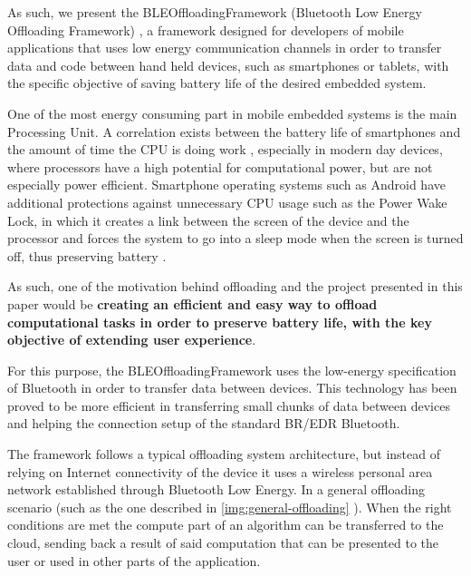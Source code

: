 As such, we present the BLEOffloadingFramework (Bluetooth Low Energy Offloading Framework) , a framework designed for developers of mobile applications that uses low energy communication channels in order to transfer data and code between hand held devices, such as smartphones or tablets, with the specific objective of saving battery life of the desired embedded system.

One of the most energy consuming part in mobile embedded systems is the main Processing Unit. A correlation exists between the battery life of smartphones and the amount of time the CPU is doing work \cite{ferreira2011understanding}, especially in modern day devices, where processors have a high potential for computational power, but are not especially power efficient. Smartphone operating systems such as Android have additional protections against unnecessary CPU usage such as the Power Wake Lock, in which it creates a link between the screen of the device and the processor and forces the system to go into a sleep mode when the screen is turned off, thus preserving battery \cite{datta2012android}.

As such, one of the motivation behind offloading and the project presented in this paper would be \textbf{creating an efficient and easy way to offload computational tasks in order to preserve battery life, with the key objective of extending user experience}.

For this purpose, the BLEOffloadingFramework uses the low-energy specification of Bluetooth in order to transfer data between devices. This technology has been proved to be more efficient in transferring small chunks of data between devices \cite{mackensen2012performance} and helping the connection setup of the standard BR/EDR Bluetooth.

The framework follows a typical offloading system architecture, but instead of relying on Internet connectivity of the device it uses a wireless personal area network established through Bluetooth Low Energy. In a general offloading scenario (such as the one described in \ref{img:general-offloading} ). When the right conditions are met the compute part of an algorithm can be transferred to the cloud, sending back a result of said computation that can be presented to the user or used in other parts of the application.





